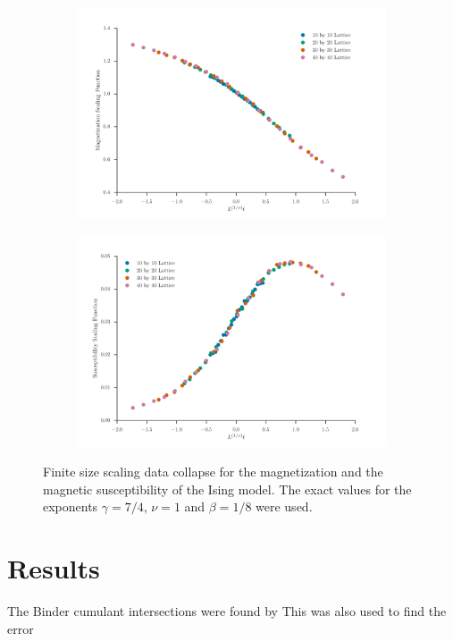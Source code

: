 \documentclass[11pt, a4paper]{report} %
\begin{document}
\begin{figure}[h]
	\centering
	\begin{subfigure}{\textwidth}
		\includegraphics[width=\textwidth]{ising_magnetization_exact_data_collapse.pdf}
	\end{subfigure}

	\begin{subfigure}{\textwidth}
		\includegraphics[width=\textwidth]{ising_susceptibility_exact_data_collapse.pdf}
	\end{subfigure}
	\caption{Finite size scaling data collapse for the magnetization and the magnetic susceptibility of the Ising model. The exact values for the exponents \(\gamma = 7/4\), \(\nu=1\) and \(\beta=1/8\) were used.}
	\label{fig:ising_data_collapse}
\end{figure}


\chapter{Results}
The Binder cumulant intersections were found by
This was also used to find the error
\end{document}
